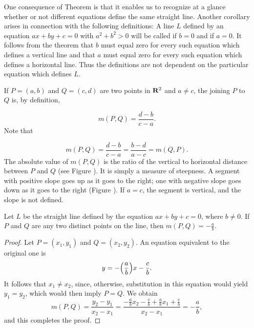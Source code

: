 One consequence of Theorem 
is that it enables us to recognize at a glance whether or not different equations define the same straight line.
Another corollary arises in connection with the following definitions: A line $L$ defined by an equation $ax + by + c = 0$ with $a^2 + b^2 > 0$ will be called  if $b = 0$ and  if $a = 0$.
It follows from the theorem that $b$ must equal zero for every such equation which defines a vertical line and that $a$ must equal zero for every such equation which defines a horizontal line.
Thus the definitions are not dependent on the particular equation which defines $L$.

If $P = (a, b)$ and $Q = (c, d)$ are two points in $\mathrm{\bf R}^2$ and $a \neq c$, the  joining $P$ to $Q$ is, by definition,

\[
m(P, Q) = \frac{d - b}{c - a} .
\]
Note that

\[
m(P, Q) = \frac{d - b}{c - a} = \frac{b - d}{a - c} = m(Q, P) .
\]
The absolute value of $m(P, Q)$ is the ratio of the vertical to horizontal distance between $P$ and $Q$ (see Figure ).
It is simply a measure of steepness.
A segment with positive slope goes up as it goes to the right; one with negative slope goes down as it goes to the right (Figure ).
If $a = c$, the segment is vertical, and the slope is not defined.


\begin{prop}\label{thm 1.5.2}
Let $L$ be the straight line defined by the equation $ax + by + c = 0$, where $b \neq 0$.
If $P$ and $Q$ are any two distinct points on the line, then $m(P, Q) = -\frac{a}{b}$.
\end{prop}

\begin{proof}
Let $P = (x_1, y_1)$ and $Q = (x_2, y_2)$.
An equation equivalent to the original one is
\begin{equation}
y = - \Bigl( \frac{a}{b} \Bigr) x - \frac{c}{b} .
\label{eq1.5.1}
\end{equation}
It follows that $x_1 \neq x_2$, since, otherwise, substitution in this equation would yield $y_1 = y_2$, which would then imply $P = Q$.
We obtain
\[
m(P, Q) = \frac{y_2 - y_1}{x_2 - x_1} =  \frac{
- \frac{a}{b} x_2
- \frac{c}{b}
+ \frac{a}{b} x_1
+ \frac{c}{b}}
{x_2 - x_1}  = -\frac{a}{b} ,
\]
and this completes the proof.
\end{proof}

